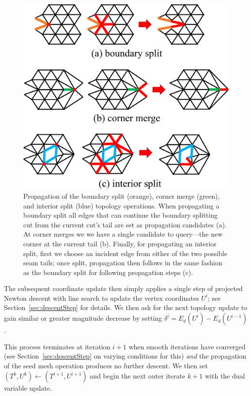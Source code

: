 
\begin{figure}[t]
\centering
\includegraphics[width=0.65\linewidth]{fig/propagation.pdf}
\caption{Propagation of the boundary split (orange), corner merge (green), and interior split (blue) topology operations. When propagating a boundary split all edges that can continue the boundary splitting cut from the current cut's tail are set as propagation candidates (a). At corner merges we we have a single candidate to query---the new corner at the current tail (b). Finally, for propagating an interior split, first we choose an incident edge from either of the two possible seam tails; once split, propagation then follows in the same fashion as the boundary split for following propagation steps (c).}
\label{fig:propagation}
\end{figure}

The subsequent coordinate update then simply applies a single step of projected Newton descent with line search to update the vertex coordinates $U^i$; see Section~\ref{sec:descentStep} for details. We then ask for the next topology update to gain similar or greater magnitude decrease by setting $\delta^i = E_d(U^i) - E_d(U^{i-1})$.

This process terminates at iteration $i+1$ when smooth iterations have converged (see Section~\ref{sec:descentStep} on varying conditions for this) \emph{and} the propagation of the seed mesh operation produces no further descent. We then set $(T^k,U^k) \leftarrow (T^{i+1},U^{i+1})$ and begin the next outer iterate $k+1$ with the dual variable update. 


